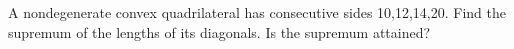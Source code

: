 A nondegenerate convex quadrilateral has consecutive sides 10,12,14,20. Find the supremum of the lengths of its diagonals. Is the supremum attained?
